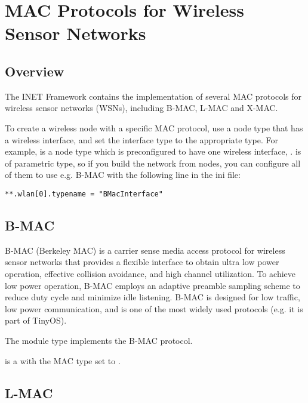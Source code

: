 \chapter{MAC Protocols for Wireless Sensor Networks}
\label{cha:sensor-macs}

\section{Overview}

The INET Framework contains the implementation of several MAC protocols
for wireless sensor networks (WSNs), including B-MAC, L-MAC and X-MAC.

To create a wireless node with a specific MAC protocol, use a node type 
that has a wireless interface, and set the interface type to the 
appropriate type. For example,  is a node type 
which is preconfigured to have one wireless interface, .
 is of parametric type, so if you build the network from
 nodes, you can configure all of them to use
e.g. B-MAC with the following line in the ini file:

\begin{verbatim}
**.wlan[0].typename = "BMacInterface"
\end{verbatim}


\section{B-MAC}
\label{sec:bmac}

B-MAC (Berkeley MAC) is a carrier sense media access protocol for 
wireless sensor networks that provides a flexible interface to obtain
ultra low power operation, effective collision avoidance, and 
high channel utilization. To achieve low power operation, 
B-MAC employs an adaptive preamble sampling scheme to reduce duty cycle 
and minimize idle listening. B-MAC is designed for low traffic, 
low power communication, and is one of the most widely used 
protocols (e.g. it is part of TinyOS).

The  module type implements the B-MAC protocol.

 is a  with the MAC type
set to .


\section{L-MAC}
\label{sec:lmac}

